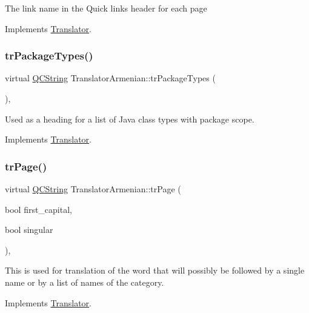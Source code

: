 The link name in the Quick links header for each page 

Implements \mbox{\hyperlink{class_translator}{Translator}}.

\mbox{\label{class_translator_armenian_a0a7f8d4a6cab2fbe23d8eac0feb70e33}} 
\subsubsection{\texorpdfstring{trPackageTypes()}{trPackageTypes()}}
{\footnotesize\ttfamily virtual \mbox{\hyperlink{class_q_c_string}{Q\+C\+String}} Translator\+Armenian\+::tr\+Package\+Types (\begin{DoxyParamCaption}{ }\end{DoxyParamCaption})\hspace{0.3cm}{\ttfamily [inline]}, {\ttfamily [virtual]}}

Used as a heading for a list of Java class types with package scope. 

Implements \mbox{\hyperlink{class_translator}{Translator}}.

\mbox{\label{class_translator_armenian_abf36c7c5bf92bafae51125f0a73eb9b0}} 
\subsubsection{\texorpdfstring{trPage()}{trPage()}}
{\footnotesize\ttfamily virtual \mbox{\hyperlink{class_q_c_string}{Q\+C\+String}} Translator\+Armenian\+::tr\+Page (\begin{DoxyParamCaption}\item[{bool}]{first\+\_\+capital,  }\item[{bool}]{singular }\end{DoxyParamCaption})\hspace{0.3cm}{\ttfamily [inline]}, {\ttfamily [virtual]}}

This is used for translation of the word that will possibly be followed by a single name or by a list of names of the category. 

Implements \mbox{\hyperlink{class_translator}{Translator}}.

